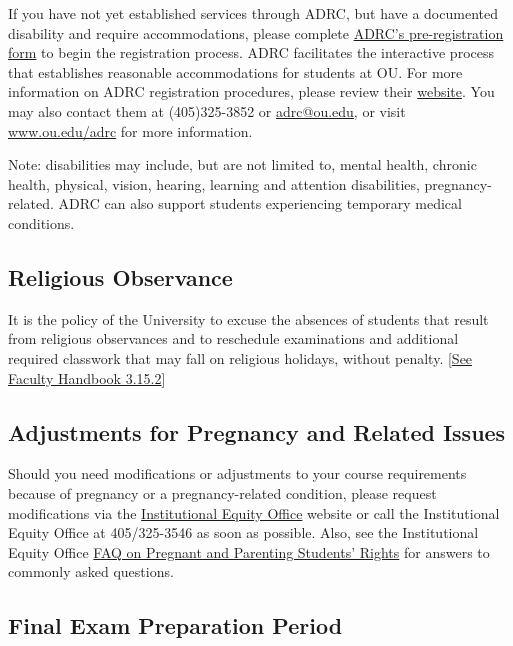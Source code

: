 \documentclass[11pt,english]{article}
\begin{document}
If you have not yet established services through ADRC, but have a documented disability and require accommodations, please complete \href{https://cm.maxient.com/reportingform.php?UnivofOklahoma&layout_id=350}{ADRC's pre-registration form} to begin the registration process. ADRC facilitates the interactive process that establishes reasonable accommodations for students at OU.  For more information on ADRC registration procedures, please review their \href{https://www.ou.edu/adrc}{website}. You may also contact them at (405)325-3852 or \href{mailto:adrc@ou.edu}{adrc@ou.edu}, or visit \url{www.ou.edu/adrc} for more information.  

Note: disabilities may include, but are not limited to, mental health, chronic health, physical, vision, hearing, learning and attention disabilities, pregnancy-related. ADRC can also support students experiencing temporary medical conditions.

\subsection*{Religious Observance}

It is the policy of the University to excuse the absences of students that result from religious observances and to reschedule examinations and additional required classwork that may fall on religious holidays, without penalty. [\href{https://apps.hr.ou.edu/FacultyHandbook/#3.15.2}{See Faculty Handbook 3.15.2}]

\subsection*{Adjustments for Pregnancy and Related Issues}

Should you need modifications or adjustments to your course requirements because of pregnancy or a pregnancy-related condition, please request modifications via the \href{https://www.ou.edu/eoo/pregnancy-and-parenting}{Institutional Equity Office} website or call the Institutional Equity Office at 405/325-3546 as soon as possible. Also, see the Institutional Equity Office \href{https://www.ou.edu/content/dam/eoo/documents/faqs/faqs-pregnant-and-parenting-students.pdf}{FAQ on Pregnant and Parenting Students' Rights} for answers to commonly asked questions.

\subsection*{Final Exam Preparation Period}
\end{document}
